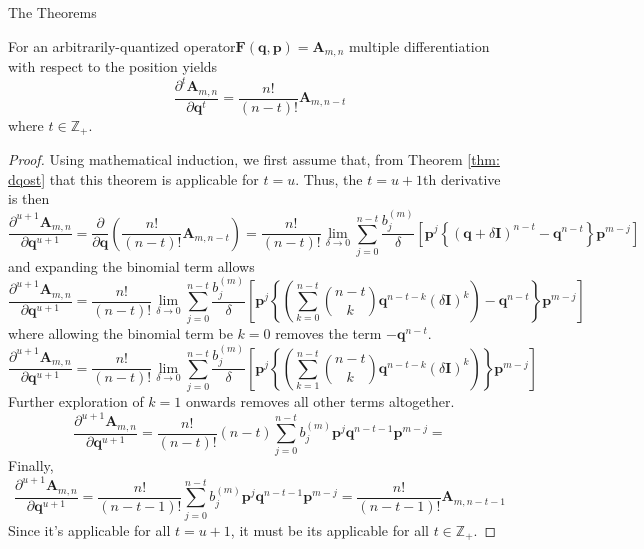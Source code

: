 \documentclass[aspectratio=169]{beamer}
\begin{document}
\begin{frame}[allowframebreaks]{The Theorems}
		\begin{theorem}
			For an arbitrarily-quantized operator$\textbf{F}(\textbf{q},\textbf{p})=\textbf{A}_{m,n}$ multiple differentiation with respect to the position yields
			\begin{equation}
				\frac{\partial^t\textbf{A}_{m,n}}{\partial\textbf{q}^t}=\frac{n!}{(n-t)!}\textbf{A}_{m,n-t}
			\end{equation}
			where $t\in\mathbb{Z}_+$. 
		\end{theorem}
		\begin{proof}
			Using mathematical induction, we first assume that, from Theorem \ref{thm: dqost} that this theorem is applicable for $t=u$. Thus, the $t=u+1$th derivative is then
			\begin{equation}
				\frac{\partial^{u+1}{\textbf{A}_{m,n}}}{\partial\textbf{q}^{u+1}}=\frac{\partial}{\partial\textbf{q}}\left(\frac{n!}{(n-t)!}\textbf{A}_{m,n-t}\right)=\frac{n!}{(n-t)!}\lim_{\delta\to0}\sum_{j=0}^{n-t}\frac{b_j^{(m)}}{\delta}\left[\textbf{p}^j\left\{(\textbf{q}+\delta\textbf{I})^{n-t}-\textbf{q}^{n-t}\right\}\textbf{p}^{m-j}\right]
			\end{equation}
			and expanding the binomial term allows
			\begin{equation}
				\frac{\partial^{u+1}{\textbf{A}_{m,n}}}{\partial\textbf{q}^{u+1}}=\frac{n!}{(n-t)!}\lim_{\delta\to0}\sum_{j=0}^{n-t}\frac{b_j^{(m)}}{\delta}\left[\textbf{p}^j\left\{\left(\sum_{k=0}^{n-t}\binom{n-t}{k}\textbf{q}^{n-t-k}(\delta\textbf{I})^k\right)-\textbf{q}^{n-t}\right\}\textbf{p}^{m-j}\right]
			\end{equation}
			where allowing the binomial term be $k=0$ removes the term $-\textbf{q}^{n-t}$. 
			\begin{equation}
				\frac{\partial^{u+1}{\textbf{A}_{m,n}}}{\partial\textbf{q}^{u+1}}=\frac{n!}{(n-t)!}\lim_{\delta\to0}\sum_{j=0}^{n-t}\frac{b_j^{(m)}}{\delta}\left[\textbf{p}^j\left\{\left(\sum_{k=1}^{n-t}\binom{n-t}{k}\textbf{q}^{n-t-k}(\delta\textbf{I})^k\right)\right\}\textbf{p}^{m-j}\right]
			\end{equation}
			Further exploration of $k=1$ onwards removes all other terms altogether. 
			\begin{equation}
				\frac{\partial^{u+1}{\textbf{A}_{m,n}}}{\partial\textbf{q}^{u+1}}=\frac{n!}{(n-t)!}(n-t)\sum_{j=0}^{n-t}b_j^{(m)}\textbf{p}^j\textbf{q}^{n-t-1}\textbf{p}^{m-j}=
			\end{equation}
			Finally,
			\begin{equation}
				\frac{\partial^{u+1}{\textbf{A}_{m,n}}}{\partial\textbf{q}^{u+1}}=\frac{n!}{(n-t-1)!}\sum_{j=0}^{n-t}b_j^{(m)}\textbf{p}^j\textbf{q}^{n-t-1}\textbf{p}^{m-j}=\frac{n!}{(n-t-1)!}\textbf{A}_{m,n-t-1}
			\end{equation}
			Since it's applicable for all $t=u+1$, it must be its applicable for all $t\in\mathbb{Z}_+$.
		\end{proof}
		

\end{frame}
\end{document}
